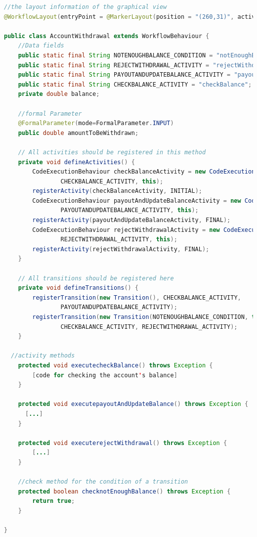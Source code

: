 \begin{lstlisting}[language = Java, caption=Wade example: Account Withdrawal Process (code view), label = list:wade_code]
//the layout information of the graphical view
@WorkflowLayout(entryPoint = @MarkerLayout(position = "(260,31)", activityName = "checkBalance"), exitPoints = { }, transitions = {@TransitionLayout(to = "rejectWithdrawal", from = "checkBalance"), @TransitionLayout(to = "payoutAndUpdateBalance", from = "checkBalance") }, activities = {@ActivityLayout(position = "(357,175)", name = "rejectWithdrawal"), @ActivityLayout(position = "(116,171)", name = "payoutAndUpdateBalance"), @ActivityLayout(position = "(222,78)", name = "checkBalance") })

public class AccountWithdrawal extends WorkflowBehaviour {
	//Data fields
	public static final String NOTENOUGHBALANCE_CONDITION = "notEnoughBalance";
	public static final String REJECTWITHDRAWAL_ACTIVITY = "rejectWithdrawal";
	public static final String PAYOUTANDUPDATEBALANCE_ACTIVITY = "payoutAndUpdateBalance";
	public static final String CHECKBALANCE_ACTIVITY = "checkBalance";
	private double balance;
	
	//formal Parameter
	@FormalParameter(mode=FormalParameter.INPUT)
	public double amountToBeWithdrawn;
	
	// All activities should be registered in this method
	private void defineActivities() {
		CodeExecutionBehaviour checkBalanceActivity = new CodeExecutionBehaviour(
				CHECKBALANCE_ACTIVITY, this);
		registerActivity(checkBalanceActivity, INITIAL);
		CodeExecutionBehaviour payoutAndUpdateBalanceActivity = new CodeExecutionBehaviour(
				PAYOUTANDUPDATEBALANCE_ACTIVITY, this);
		registerActivity(payoutAndUpdateBalanceActivity, FINAL);
		CodeExecutionBehaviour rejectWithdrawalActivity = new CodeExecutionBehaviour(
				REJECTWITHDRAWAL_ACTIVITY, this);
		registerActivity(rejectWithdrawalActivity, FINAL);
	}

	// All transitions should be registered here
	private void defineTransitions() {
		registerTransition(new Transition(), CHECKBALANCE_ACTIVITY,
				PAYOUTANDUPDATEBALANCE_ACTIVITY);
		registerTransition(new Transition(NOTENOUGHBALANCE_CONDITION, this),
				CHECKBALANCE_ACTIVITY, REJECTWITHDRAWAL_ACTIVITY);
	}

  //activity methods
	protected void executecheckBalance() throws Exception {
		[code for checking the account's balance]
	}

	protected void executepayoutAndUpdateBalance() throws Exception {
	  [...]
	}

	protected void executerejectWithdrawal() throws Exception {
		[...]
	}

	//check method for the condition of a transition
	protected boolean checknotEnoughBalance() throws Exception {
		return true;
	}

}
\end{lstlisting}


